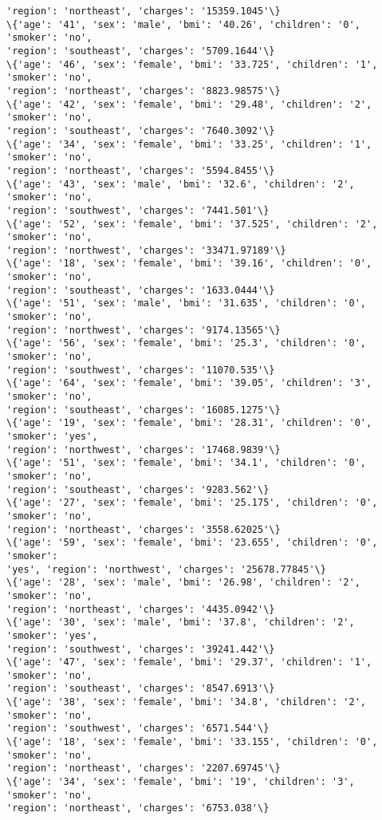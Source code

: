 \documentclass[11pt]{article}
\begin{document}
\begin{Verbatim}[commandchars=\\\{\}]
'region': 'northeast', 'charges': '15359.1045'\}
\{'age': '41', 'sex': 'male', 'bmi': '40.26', 'children': '0', 'smoker': 'no',
'region': 'southeast', 'charges': '5709.1644'\}
\{'age': '46', 'sex': 'female', 'bmi': '33.725', 'children': '1', 'smoker': 'no',
'region': 'northeast', 'charges': '8823.98575'\}
\{'age': '42', 'sex': 'female', 'bmi': '29.48', 'children': '2', 'smoker': 'no',
'region': 'southeast', 'charges': '7640.3092'\}
\{'age': '34', 'sex': 'female', 'bmi': '33.25', 'children': '1', 'smoker': 'no',
'region': 'northeast', 'charges': '5594.8455'\}
\{'age': '43', 'sex': 'male', 'bmi': '32.6', 'children': '2', 'smoker': 'no',
'region': 'southwest', 'charges': '7441.501'\}
\{'age': '52', 'sex': 'female', 'bmi': '37.525', 'children': '2', 'smoker': 'no',
'region': 'northwest', 'charges': '33471.97189'\}
\{'age': '18', 'sex': 'female', 'bmi': '39.16', 'children': '0', 'smoker': 'no',
'region': 'southeast', 'charges': '1633.0444'\}
\{'age': '51', 'sex': 'male', 'bmi': '31.635', 'children': '0', 'smoker': 'no',
'region': 'northwest', 'charges': '9174.13565'\}
\{'age': '56', 'sex': 'female', 'bmi': '25.3', 'children': '0', 'smoker': 'no',
'region': 'southwest', 'charges': '11070.535'\}
\{'age': '64', 'sex': 'female', 'bmi': '39.05', 'children': '3', 'smoker': 'no',
'region': 'southeast', 'charges': '16085.1275'\}
\{'age': '19', 'sex': 'female', 'bmi': '28.31', 'children': '0', 'smoker': 'yes',
'region': 'northwest', 'charges': '17468.9839'\}
\{'age': '51', 'sex': 'female', 'bmi': '34.1', 'children': '0', 'smoker': 'no',
'region': 'southeast', 'charges': '9283.562'\}
\{'age': '27', 'sex': 'female', 'bmi': '25.175', 'children': '0', 'smoker': 'no',
'region': 'northeast', 'charges': '3558.62025'\}
\{'age': '59', 'sex': 'female', 'bmi': '23.655', 'children': '0', 'smoker':
'yes', 'region': 'northwest', 'charges': '25678.77845'\}
\{'age': '28', 'sex': 'male', 'bmi': '26.98', 'children': '2', 'smoker': 'no',
'region': 'northeast', 'charges': '4435.0942'\}
\{'age': '30', 'sex': 'male', 'bmi': '37.8', 'children': '2', 'smoker': 'yes',
'region': 'southwest', 'charges': '39241.442'\}
\{'age': '47', 'sex': 'female', 'bmi': '29.37', 'children': '1', 'smoker': 'no',
'region': 'southeast', 'charges': '8547.6913'\}
\{'age': '38', 'sex': 'female', 'bmi': '34.8', 'children': '2', 'smoker': 'no',
'region': 'southwest', 'charges': '6571.544'\}
\{'age': '18', 'sex': 'female', 'bmi': '33.155', 'children': '0', 'smoker': 'no',
'region': 'northeast', 'charges': '2207.69745'\}
\{'age': '34', 'sex': 'female', 'bmi': '19', 'children': '3', 'smoker': 'no',
'region': 'northeast', 'charges': '6753.038'\}

\end{Verbatim}
\end{document}
